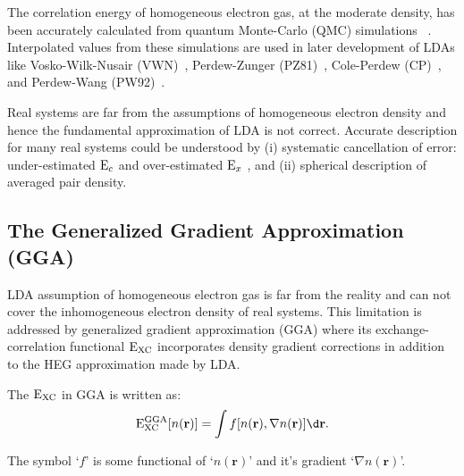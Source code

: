 \begin{sloppypar}
The correlation energy of homogeneous electron gas, at the moderate density, has been accurately calculated from quantum Monte-Carlo (QMC) simulations ~\citep{Ceperley1980}. Interpolated values from these simulations are used in later development of LDAs like Vosko-Wilk-Nusair (VWN)~\citep{Vosko1980}, Perdew-Zunger (PZ81)~\citep{Perdew1981}, Cole-Perdew (CP)~\citep{Cole1982}, and Perdew-Wang (PW92)~\citep{Perdew1992}.
\end{sloppypar}

Real systems are far from the assumptions of homogeneous electron density and hence the fundamental approximation of LDA is not correct. Accurate description for many real systems could be understood by (i) systematic cancellation of error: under-estimated ${\rm E}_{c}$ and over-estimated ${\rm E}_{x}$ \citep{Levine2009, Parr1994}, and (ii) spherical description of averaged pair density.
\subsection{The Generalized Gradient Approximation (GGA)}
LDA assumption of homogeneous electron gas is far from the reality and can not cover the inhomogeneous electron density of real systems. This limitation is addressed by generalized gradient approximation (GGA) where its exchange-correlation functional ${\rm E}_{\rm XC}$ incorporates density gradient corrections in addition to the HEG approximation made by LDA.

The ${\rm E}_{\rm XC}$ in GGA is written as:
\begin{eqnarray}
{\rm E}_{\rm XC}^{\rm GGA}[n(\textbf{r})] = \int f[n(\textbf{r}),\nabla n(\textbf{r})]\d\textbf{r} .
\end{eqnarray}

The symbol `$f$' is some functional of `$n(\textbf{r})$' and it's gradient `$\nabla n(\textbf{r})$'.

